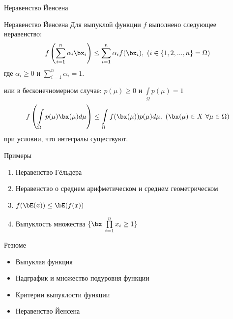 \documentclass[12pt]{beamer}
\begin{document}
\begin{frame}{Неравенство Йенсена}
 
\begin{block}{Неравенство Йенсена}
Для выпуклой функции $f$ выполнено следующее неравенство:
\vspace{-4mm}
\[
f\left( \sum\limits_{i=1}^n \alpha_i \bx_i \right) \leq \sum\limits_{i=1}^n \alpha_i f(\bx_i),\ (i\in\{1,2,...,n\} = \Omega)
\vspace{-4mm}
\] 
где $\alpha_i \geq 0$ и $\sum\limits_{i=1}^n \alpha_i = 1$.
\end{block}

или в бесконечномерном случае: $p(\mu) \geq 0$ и $\int\limits_\Omega p(\mu) = 1$ 
\vspace{-4mm}
\[
f\left( \int\limits_\Omega p(\mu)\bx(\mu)d\mu \right) \leq \int\limits_\Omega f(\bx(\mu))p(\mu)d\mu,\ (\bx(\mu)\in X\ \forall \mu\in\Omega)
\]
при условии, что интегралы существуют.

\end{frame}

\begin{frame}{Примеры}
\begin{enumerate}
\item Неравенство Гёльдера
\item Неравенство о среднем арифметическом и среднем геометрическом
\item $f(\bE(x)) \leq \bE(f(x))$
\item Выпуклость множества $\{ \bx | \prod\limits_{i=1}^n x_i \geq 1 \}$
\end{enumerate}
\end{frame}

\begin{frame}{Резюме}
\begin{itemize}
\item Выпуклая функция
\item Надграфик и множество подуровня функции
\item Критерии выпуклости функции
\item Неравенство Йенсена
\end{itemize}
\end{frame}
\end{document}
